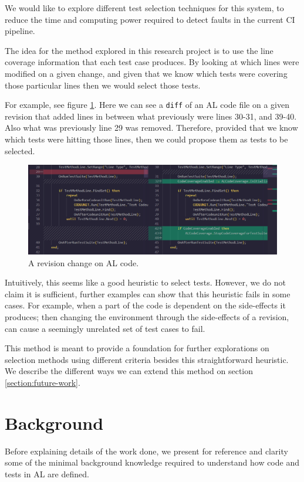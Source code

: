 \documentclass{article}
\begin{document}
   We would like to explore different test selection techniques for this system, to reduce the time and computing power required to detect faults in the current CI pipeline.

The idea for the method explored in this research project is to use the line coverage information that each test case produces. By looking at which lines were modified on a given change, and given that we know which tests were covering those particular lines then we would select those tests.

For example, see figure \ref{fig:diff}. Here we can see a \texttt{diff} of an AL code file on a given revision that added lines in between what previously were lines 30-31, and 39-40. Also what was previously line 29 was removed. Therefore, provided that we know which tests were hitting those lines, then we could propose them as tests to be selected.

\begin{figure}[H]
  \includegraphics[width=\textwidth]{images/diff.png}
  \caption{A revision change on AL code.}
  \label{fig:diff}
\end{figure}

Intuitively, this seems like a good heuristic to select tests. However, we do not claim it is sufficient, further examples can show that this heuristic fails in some cases. For example, when a part of the code is dependent on the side-effects it produces; then changing the environment through the side-effects of a revision, can cause a seemingly unrelated set of test cases to fail.

This method is meant to provide a foundation for further explorations on selection methods using different criteria besides this straightforward heuristic. We describe the different ways we can extend this method on section \ref{section:future-work}.
\section{Background}\label{section:al-background-info}
Before explaining details of the work done, we present for reference and clarity some of the minimal background knowledge required to understand how code and tests in AL are defined.
\end{document}
